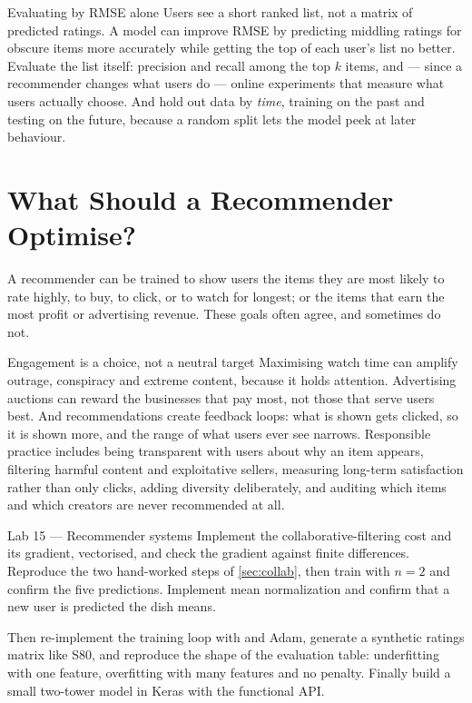\begin{pitfall}{Evaluating by RMSE alone}
Users see a short ranked list, not a matrix of predicted ratings. A model can
improve RMSE by predicting middling ratings for obscure items more accurately
while getting the top of each user's list no better. Evaluate the list itself:
precision and recall among the top $k$ items, and --- since a recommender changes
what users do --- online experiments that measure what users actually choose.
And hold out data by \emph{time}, training on the past and testing on the
future, because a random split lets the model peek at later behaviour.
\end{pitfall}

\section{What Should a Recommender Optimise?}
\label{sec:rec-ethics}

A recommender can be trained to show users the items they are most likely to rate
highly, to buy, to click, or to watch for longest; or the items that earn the most
profit or advertising revenue. These goals often agree, and sometimes do not.

\begin{ethicsnote}{Engagement is a choice, not a neutral target}
Maximising watch time can amplify outrage, conspiracy and extreme content,
because it holds attention. Advertising auctions can reward the businesses that
pay most, not those that serve users best. And recommendations create feedback
loops: what is shown gets clicked, so it is shown more, and the range of what
users ever see narrows. Responsible practice includes being transparent with
users about why an item appears, filtering harmful content and exploitative
sellers, measuring long-term satisfaction rather than only clicks, adding
diversity deliberately, and auditing which items and which creators are never
recommended at all.
\end{ethicsnote}

\begin{labbox}{Lab 15 --- Recommender systems}
Implement the collaborative-filtering cost and its gradient, vectorised, and
check the gradient against finite differences. Reproduce the two hand-worked steps
of \cref{sec:collab}, then train with $n = 2$ and confirm the five predictions.
Implement mean normalization and confirm that a new user is predicted the dish
means.

Then re-implement the training loop with  and Adam,
generate a synthetic ratings matrix like S80, and reproduce the shape of the
evaluation table: underfitting with one feature, overfitting with many features
and no penalty. Finally build a small two-tower model in Keras with the functional
API.
\end{labbox}

